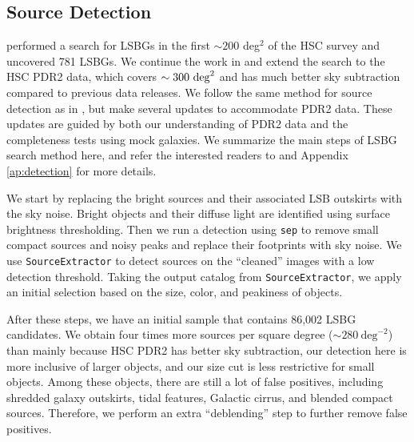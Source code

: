 \documentclass[twocolumn,astrosymb,twocolappendix]{aastex631}
\newcommand{\code}[1]{\texttt{#1}}
\begin{document}
\begin{CJK*}{UTF8}{gbsn}
\subsection{Source Detection}\label{sec:detection}
 performed a search for LSBGs in the first $\sim 200$ deg$^2$ of the HSC survey and uncovered 781 LSBGs. We continue the work in  and extend the search to the HSC PDR2 data, which covers $\sim 300\ \rm{deg}^{2}$ and has much better sky subtraction compared to previous data releases. We follow the same method for source detection as in , but make several updates to accommodate PDR2 data. These updates are guided by both our understanding of PDR2 data and the completeness tests using mock galaxies. We summarize the main steps of LSBG search method here, and refer the interested readers to  and Appendix \ref{ap:detection} for more details. 

We start by replacing the bright sources and their associated LSB outskirts with the sky noise. Bright objects and their diffuse light are identified using surface brightness thresholding. Then we run a detection using \code{sep} \citep{Barbary2016} to remove small compact sources and noisy peaks and replace their footprints with sky noise. We use \code{SourceExtractor} to detect sources on the ``cleaned'' images with a low detection threshold. Taking the output catalog from \code{SourceExtractor}, we apply an initial selection based on the size, color, and peakiness of objects. 

After these steps, we have an initial sample that contains 86,002 LSBG candidates. We obtain four times more sources per square degree ($\sim 280\ \mathrm{deg}^{-2}$) than  mainly because HSC PDR2 has better sky subtraction, our detection here is more inclusive of larger objects, and our size cut is less restrictive for small objects. Among these objects, there are still a lot of false positives, including shredded galaxy outskirts, tidal features, Galactic cirrus, and blended compact sources. Therefore, we perform an extra ``deblending'' step to further remove false positives.  



\end{CJK*}
\end{document}
